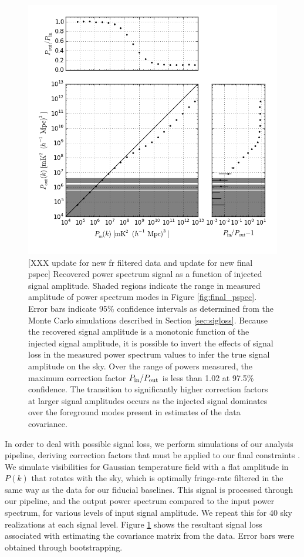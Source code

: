 \documentclass[twocolumn,numberedappendix]{emulateapj} \shorttitle{New Limits on the 21 cm Power Spectrum at $z=8.4$}
\begin{document}
\begin{figure}
\centering
\includegraphics[width=\columnwidth]{plots/sigloss.png}
\caption{
[XXX update for new fr filtered data and update for new final pspec]
Recovered power spectrum signal as a function of injected signal amplitude.  Shaded regions
indicate the range in measured amplitude of power spectrum modes in Figure \ref{fig:final_pspec}.  
Error bars indicate 95\% confidence intervals as determined from the Monte Carlo simulations
described in Section \ref{sec:sigloss}.
Because
the recovered signal amplitude is a monotonic function of the injected signal amplitude,
it is possible to invert the effects of signal loss in the measured power spectrum values
to infer the true signal amplitude on the sky. Over the range of powers measured, the 
maximum correction factor $P_{\rm in}/P_{\rm out}$ is less than 1.02 at 97.5\% confidence.
The transition to significantly higher correction factors at larger signal amplitudes
occurs as the injected signal
dominates over the foreground modes present in estimates of the data covariance.
}\label{fig:signal_loss}
\end{figure}

In order to deal with possible signal loss, we perform simulations of our analysis pipeline, 
deriving correction factors that must be applied to our final constraints . We simulate visibilities for
Gaussian temperature field with a flat amplitude in $P(k)$ that rotates with the
sky, which is optimally fringe-rate filtered in the same way as the data for our fiducial baselines. This signal is processed through our pipeline, and the output power spectrum compared to the input
power spectrum, for various levels of input signal amplitude.
We repeat this for 40 sky realizations at each signal level.  Figure
\ref{fig:signal_loss} shows the resultant signal loss associated with
estimating the covariance matrix from the data.  Error bars were obtained
through bootstrapping.
\end{document}
